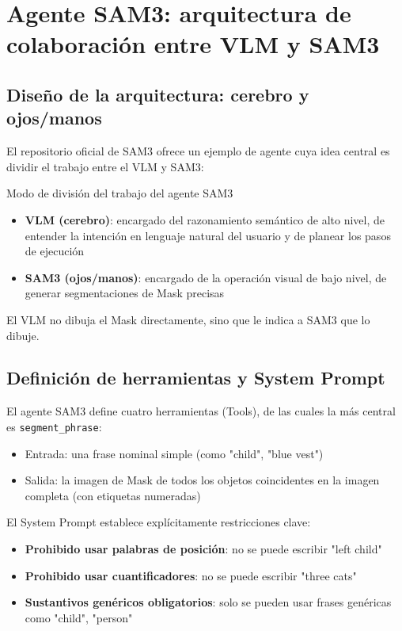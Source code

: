 \section{Agente SAM3: arquitectura de colaboración entre VLM y SAM3}

\subsection{Diseño de la arquitectura: cerebro y ojos/manos}

El repositorio oficial de SAM3 ofrece un ejemplo de agente cuya idea central es dividir el trabajo entre el VLM y SAM3:

\begin{importantbox}{Modo de división del trabajo del agente SAM3}
\begin{itemize}
    \item \textbf{VLM (cerebro)}: encargado del razonamiento semántico de alto nivel, de entender la intención en lenguaje natural del usuario y de planear los pasos de ejecución
    \item \textbf{SAM3 (ojos/manos)}: encargado de la operación visual de bajo nivel, de generar segmentaciones de Mask precisas
\end{itemize}
El VLM no dibuja el Mask directamente, sino que le indica a SAM3 que lo dibuje.
\end{importantbox}

\subsection{Definición de herramientas y System Prompt}

El agente SAM3 define cuatro herramientas (Tools), de las cuales la más central es \texttt{segment\_phrase}:

\begin{itemize}
    \item Entrada: una frase nominal simple (como "child", "blue vest")
    \item Salida: la imagen de Mask de todos los objetos coincidentes en la imagen completa (con etiquetas numeradas)
\end{itemize}

El System Prompt establece explícitamente restricciones clave:
\begin{itemize}
    \item \textbf{Prohibido usar palabras de posición}: no se puede escribir "left child"
    \item \textbf{Prohibido usar cuantificadores}: no se puede escribir "three cats"
    \item \textbf{Sustantivos genéricos obligatorios}: solo se pueden usar frases genéricas como "child", "person"
\end{itemize}

